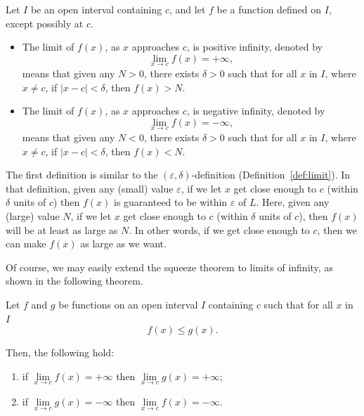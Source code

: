 \begin{definition}\label{def:limit_of_infinity}
Let $I$ be an open interval containing $c$, and let $f$ be a function defined on $I$, except possibly at $c$. 
\begin{itemize}
\item The limit of $f(x)$, as $x$ approaches $c$, is positive infinity, denoted by  
$$\displaystyle \lim_{x\rightarrow c} f(x) = +\infty,$$
means that given any $N > 0$, there exists $\delta > 0$ such that for all $x$ in $I$, where $x\neq c$,  
if  $|x - c| < \delta$, then $f(x) >N$.

\item The limit of $f(x)$, as $x$ approaches $c$, is negative infinity, denoted by  
$$\displaystyle \lim_{x\rightarrow c} f(x) = -\infty,$$
means that given any $N < 0$, there exists $\delta > 0$ such that for all $x$ in $I$, where $x\neq c$,  
if  $|x - c| < \delta$, then $f(x)  < N$.

\end{itemize}%
\end{definition}


\ifcourse

The first definition is similar to the $(\varepsilon,\delta)$-definition  (Definition~\ref{def:limit}).  In that definition, given any (small) value $\varepsilon$, if we let $x$ get close enough to $c$ (within $\delta$ units of $c$) then $f(x)$ is guaranteed to be within $\varepsilon$ of $L$.  Here, given any (large) value $N$, if we let $x$ get close enough to $c$ (within $\delta$ units of $c$), then $f(x)$ will be at least as large as $N$.  In other words, if we get close enough to $c$, then we can make $f(x)$ as large as we want.

\ifanalysis

Of course, we may easily extend the squeeze theorem to limits of infinity, as shown in the following theorem. 

\begin{theorem}
Let $f$ and $g$ be functions on an open interval $I$ containing $c$ such that for all $x$ in $I$
 $$f(x) \leq g(x).$$

Then, the following hold: 
\begin{enumerate}
\item  if $\lim\limits_{x \rightarrow c}f(x) = +\infty$ then $\lim\limits_{x \rightarrow c}g(x) = +\infty$; 
\item if $\lim\limits_{x \rightarrow c}g(x) = -\infty$ then $\lim\limits_{x \rightarrow c}f(x) = -\infty$. 
\end{enumerate}
\end{theorem}



